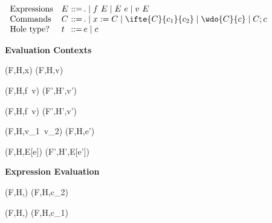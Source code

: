 \begin{figure*}
\begin{comment}
(* Expression evaluation: (F,H,e) - o -> (F',H',e') *)

(* Notational convention: 
   write 
     (F,H,e) - None -> (F',H',e') 
   as 
     (F,H,e) --> (F',H',e') 
*)  

(* Command evaluation: (F,H,c) - o -> (F',H',c') *)
C[t] needs to be well-formed...

(* Multi-step command evaluation: (F,H,c) - l -> (F',H',c') *)
\end{comment}
\begin{minipage}[t]{\linewidth}
\begin{displaymath}
\begin{array}{l@{\quad}l@{~}l@{\,}ll@{}}
 \text{Expressions} & E  & ::= & . \mid f~E \mid E~e \mid v~E \\
 \text{Commands} & C  & ::= & . \mid x := C \mid \ifte{C}{c_1}{c_2} \mid \wdo{C}{c} \mid C ; c \\
 \text{Hole type?} & t & ::=  & e \mid c
\end{array}
\end{displaymath}
\end{minipage}
\centerline{\textbf{Evaluation Contexts}}

{(F,H,x) \rightarrow (F,H,v)}

{(F,H,f~v)  (F',H',v')}

{(F,H,f~v) \rightarrow (F',H',v')}

{(F,H,v_1~v_2) \rightarrow (F,H,e')}

{(F,H,E[e])  (F',H',E[e'])}
\centerline{\textbf{Expression Evaluation}}

\infrule[C-IfFalse]
{}
{(F,H,) \rightarrow (F,H,c_2)}

{(F,H,) \rightarrow (F,H,c_1)}


\end{figure*}
